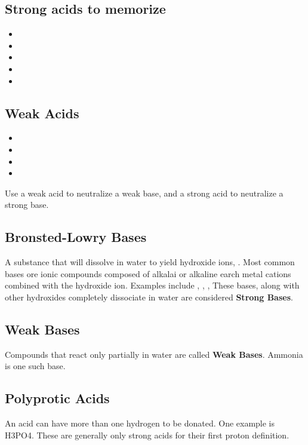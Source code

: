 \documentclass[11pt, letterpaper]{article}
\begin{document}
\subsection*{Strong acids to memorize}

\begin{itemize}
	\item {}
	\item {}
	\item
	\item
	\item
\end{itemize}

\subsection*{Weak Acids}

\begin{itemize}
	\item {}
	\item {}
	\item 
	\item
\end{itemize}

Use a weak acid to neutralize a weak base, and a strong acid to neutralize a strong base.

\subsection*{Bronsted-Lowry Bases}

A substance that will dissolve in water to yield hydroxide ions, .
Most common bases ore ionic compounds composed of alkalai or alkaline earch metal cations
combined with the hydroxide ion.
Examples include , , , 
These bases, along with other hydroxides completely dissociate in water are considered 
\textbf{Strong Bases}.

\subsection*{Weak Bases}
Compounds that react only partially in water are called \textbf{Weak Bases}.
Ammonia is one such base.

\subsection*{Polyprotic Acids}
An acid can have more than one hydrogen to be donated.
One example is H3PO4.
These are generally only strong acids for their first proton definition.
\end{document}
